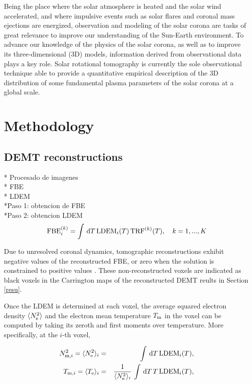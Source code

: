 \documentclass[namedreferences]{solarphysics}
\newcommand{\LDEM}{{\rm LDEM}}
\newcommand{\FBE}{{\rm FBE}}
\newcommand{\TRF}{{\rm TRF}}
\newcommand{\Te}{T_{\rm e}}
\newcommand{\Tm}{T_{\rm m}}
\newcommand{\Tmi}{T_{{\rm m},i}}
\newcommand{\Ne}{N_{\rm e}}
\newcommand{\Nsqmi}{N^2_{{\rm m},i}}
\def\albert#1{\textcolor{blue}{#1}}
\def\temp#1{\textcolor{mygray}{#1}}
\begin{document}
\begin{article}
Being the place where the solar atmosphere is heated and the solar wind accelerated, and where impulsive events such as solar flares and coronal mass ejections are energized, observation and modeling of the solar corona are tasks of great relevance to improve our understanding of the Sun-Earth environment. To advance our knowledge of the physics of the solar corona, as well as to improve its three-dimensional (3D) models, information derived from observational data plays a key role. Solar rotational tomography is currently the sole observational technique able to provide a quantitative empirical description of the 3D distribution of some fundamental plasma parameters of the solar corona at a global scale.


\section{Methodology}\label{meto}   

\subsection{DEMT reconstructions}\label{demt}
\temp{* Procesado de imagenes}\\
\temp{* FBE}\\
\temp{* LDEM}\\
*Paso 1: obtencion de FBE\\
*Paso 2: obtencion LDEM
\begin{equation}\label{fbeldem}
\FBE_i^{(k)}  = \int\,\textrm{d}T\,\LDEM_i(T)\,{\TRF}^{(k)}(T), \ \ \ {k=1,...,K}
\end{equation}

\temp{
Due to unresolved coronal dynamics, tomographic reconstructions exhibit negative values of the reconstructed FBE, or zero when the solution is constrained to positive values \citep{frazin_2000,frazin_2009}. These non-reconstructed voxels are indicated as black voxels in the Carrington maps of the reconstructed DEMT reults in Section \ref{resu}.
}

Once the LDEM is determined at each voxel, the average squared electron density $\langle \Ne^2 \rangle$ and the electron mean temperature $\Tm$ in the voxel can be computed by taking its zeroth and first moments over temperature. More specifically, at the $i$-th voxel,

\albert{
\begin{eqnarray}\label{momento1}
 \Nsqmi = \langle \Ne^2 \rangle_i &=& \int\,\textrm{d}T\,\LDEM_i(T),\label{Ne} \\ 
\label{momento2}
 \Tmi  = \langle \Te \rangle_i &=& \frac{1}{\langle \Ne^2 \rangle_i}\,\int\,\textrm{d}T\,T\,\LDEM_i(T),\label{Tm} 
\end{eqnarray}
}


\end{article}
\end{document}
